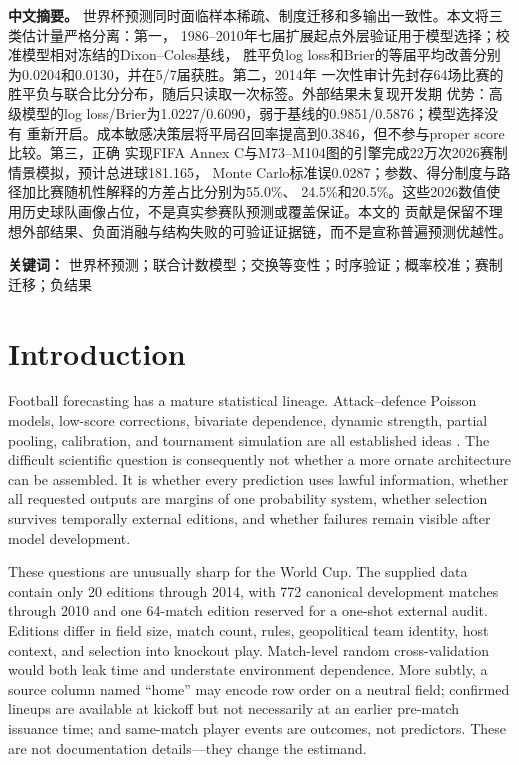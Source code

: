 \documentclass[11pt]{article}
\begin{document}
\begin{center}
\begin{minipage}{0.95\linewidth}
\textbf{中文摘要。}
世界杯预测同时面临样本稀疏、制度迁移和多输出一致性。本文将三类估计量严格分离：第一，
1986--2010年七届扩展起点外层验证用于模型选择；校准模型相对冻结的Dixon--Coles基线，
胜平负log loss和Brier的等届平均改善分别为0.0204和0.0130，并在5/7届获胜。第二，2014年
一次性审计先封存64场比赛的胜平负与联合比分分布，随后只读取一次标签。外部结果未复现开发期
优势：高级模型的log loss/Brier为1.0227/0.6090，弱于基线的0.9851/0.5876；模型选择没有
重新开启。成本敏感决策层将平局召回率提高到0.3846，但不参与proper score比较。第三，正确
实现FIFA Annex C与M73--M104图的引擎完成22万次2026赛制情景模拟，预计总进球181.165，
Monte Carlo标准误0.0287；参数、得分制度与路径加比赛随机性解释的方差占比分别为55.0\%、
24.5\%和20.5\%。这些2026数值使用历史球队画像占位，不是真实参赛队预测或覆盖保证。本文的
贡献是保留不理想外部结果、负面消融与结构失败的可验证证据链，而不是宣称普遍预测优越性。

\textbf{关键词：} 世界杯预测；联合计数模型；交换等变性；时序验证；概率校准；赛制迁移；负结果
\end{minipage}
\end{center}

\section{Introduction}

Football forecasting has a mature statistical lineage.  Attack--defence Poisson models,
low-score corrections, bivariate dependence, dynamic strength, partial pooling, calibration, and
tournament simulation are all established ideas
\citep{maher1982,dixoncoles1997,karlisntzoufras2003,ruesalvesen2000,baioblangiardo2010,dyteclarke2000}.
The difficult scientific question is consequently not whether a more ornate architecture can be
assembled.  It is whether every prediction uses lawful information, whether all requested outputs
are margins of one probability system, whether selection survives temporally external editions,
and whether failures remain visible after model development.

These questions are unusually sharp for the World Cup.  The supplied data contain only 20 editions
through 2014, with 772 canonical development matches through 2010 and one 64-match edition reserved
for a one-shot external audit.  Editions differ in field size, match count, rules, geopolitical team
identity, host context, and selection into knockout play.  Match-level random cross-validation
would both leak time and understate environment dependence.  More subtly, a source column named
``home'' may encode row order on a neutral field; confirmed lineups are available at kickoff but
not necessarily at an earlier pre-match issuance time; and same-match player events are outcomes,
not predictors.  These are not documentation details---they change the estimand.
\end{document}
